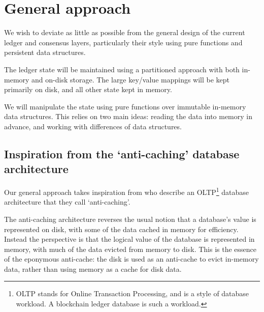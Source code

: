 \documentclass[11pt,a4paper]{article}
\begin{document}
\section{General approach}
\label{general-approach}

We wish to deviate as little as possible from the general design of the current
ledger and consensus layers, particularly their style using pure functions and
persistent data structures.

The ledger state will be maintained using a partitioned approach with both
in-memory and on-disk storage. The large key/value mappings will be kept primarily on
disk, and all other state kept in memory.

We will manipulate the state using pure functions over immutable in-memory data
structures. This relies on two main ideas: reading the data into memory in
advance, and working with differences of data structures.

\subsection{Inspiration from the `anti-caching' database architecture}
\label{anti-caching}

Our general approach takes inspiration from \cite{anti-caching} who describe
an OLTP\footnote{OLTP stands for Online Transaction Processing, and is a style
of database workload. A blockchain ledger database is such a workload.} database architecture that they call `anti-caching'.

The anti-caching architecture reverses the usual notion that a database's value
is represented on disk, with some of the data cached in memory for efficiency.
Instead the perspective is that the logical value of the database is represented
in memory, with much of the data evicted from memory to disk. This is the
essence of the eponymous anti-cache: the disk is used as an anti-cache to evict
in-memory data, rather than using memory as a cache for disk data.

\end{document}
